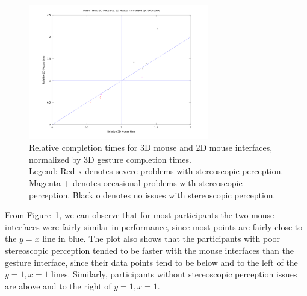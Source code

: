 \documentclass[pageno]{jpaper}
\begin{document}
\begin{figure}[h]
\centering
\includegraphics[width=0.7\textwidth]{figures/mousebygesture3d.png}
\caption{Relative completion times for 3D mouse and 2D mouse interfaces,
normalized by 3D gesture completion times. \\
Legend: Red x denotes severe problems with stereoscopic perception. Magenta +
denotes occasional problems with stereoscopic perception. Black o denotes no
issues with stereoscopic perception.}
\label{fig:mousevs3dg}
\end{figure}

From Figure~\ref{fig:mousevs3dg}, we can observe that for most participants
the two mouse interfaces were fairly similar in performance, since most points
are fairly close to the $y = x$ line in blue. The plot also shows that the
participants with poor stereoscopic perception tended to be faster with the
mouse interfaces than the gesture interface, since their data points tend to be below
and to the left of the $y = 1, x = 1$ lines. Similarly, participants without
stereoscopic perception issues are above and to the right of $y = 1, x = 1$.
\end{document}
